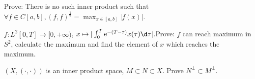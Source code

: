 \documentclass{ctexart}
\newif\ifpreface
\begin{document}
\large
\setlength{\baselineskip}{1.2em}
\ifpreface

\else
\maketitle
\fi
{}
\begin{problem}
Prove: There is no such inner product such that $\forall f\in C[a,b], (f,f)^{\frac{1}{2}}= \max_{x\in[a,b]} |f(x)|$.
\end{problem}


\begin{problem}
$f:L^2[0,T]\to[0,+\infty)$, $x\mapsto |\int_0^T \mathrm{e}^{-(T-\tau)}x(\tau)\d \tau|$.Prove: $f$ can reach maximum in $S^2$, calculate the maximum and find the element of $x$ which reaches the maximum.
\end{problem}

\begin{problem}
$(X,(\cdot,\cdot))$ is an inner product space, $M\subset N\subset X$. Prove $N^{\perp}\subset M^{\perp}$.
\end{problem}
\end{document}
